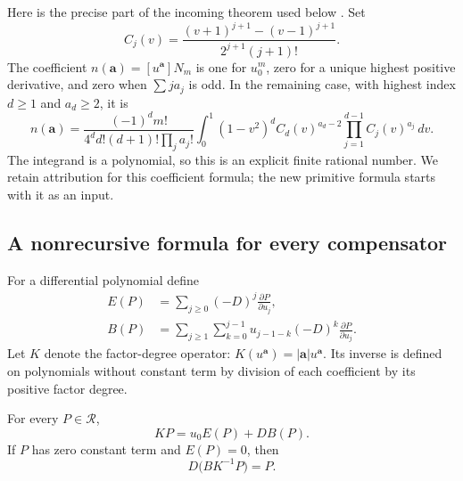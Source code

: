 Here is the precise part of the incoming theorem used below
\cite{UniversalIncoming}. Set
\begin{equation}\label{hp:C}
 C_j(v)=\frac{(v+1)^{j+1}-(v-1)^{j+1}}
                  {2^{j+1}(j+1)!}.
\end{equation}
The coefficient $n(\boldsymbol a)=[u^{\boldsymbol a}]N_m$ is one
for $u_0^m$, zero for a unique highest positive derivative, and zero
when $\sum j a_j$ is odd. In the remaining case, with highest index
$d\ge1$ and $a_d\ge2$, it is
\begin{equation}\label{hp:normal-coefficient}
 n(\boldsymbol a)=
 \frac{(-1)^d m!}{4^d d!(d+1)!\prod_j a_j!}
 \int_0^1(1-v^2)^d
     C_d(v)^{a_d-2}\prod_{j=1}^{d-1}C_j(v)^{a_j}\,dv.
\end{equation}
The integrand is a polynomial, so this is an explicit finite rational
number. We retain attribution for this coefficient formula; the new
primitive formula starts with it as an input.

\subsection{A nonrecursive formula for every compensator}

For a differential polynomial define
\begin{align}
 E(P)&=\sum_{j\ge0}(-D)^j\frac{\partial P}{\partial u_j},
                                      \label{hp:Euler}\\
 B(P)&=\sum_{j\ge1}\sum_{k=0}^{j-1}
           u_{j-1-k}(-D)^k\frac{\partial P}{\partial u_j}.
                                      \label{hp:boundary}
\end{align}
Let $K$ denote the factor-degree operator:
$K(u^{\boldsymbol a})=|\boldsymbol a|u^{\boldsymbol a}$.
Its inverse is defined on polynomials without constant term by
division of each coefficient by its positive factor degree.

\begin{lemma}\label{hp:homotopy-lemma}
For every $P\in\mathcal R$,
\begin{equation}\label{hp:Euler-boundary}
                 KP=u_0E(P)+DB(P).
\end{equation}
If $P$ has zero constant term and $E(P)=0$, then
\begin{equation}\label{hp:closed-homotopy}
                   D\bigl(BK^{-1}P\bigr)=P.
\end{equation}
\end{lemma}

